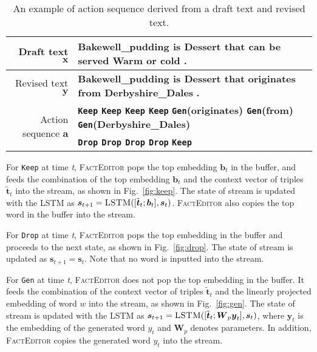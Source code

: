 \documentclass[11pt,a4paper]{article}
\newcommand{\orange}[1]{{\color[HTML]{ff7f0e}\textbf{#1}}}
\newcommand{\blue}[1]{{\color[HTML]{1f77b4}\textbf{#1}}}
\newcommand{\green}[1]{{\color[HTML]{2ca02c}\textbf{#1}}}
\begin{document}
\begin{table*}[t]
    \centering
    \small
    \begin{tabular}{r|l}
        \toprule
        Draft text $\boldsymbol{x}$ & \green{Bakewell\_pudding} \green{is} \green{Dessert} \green{that} \orange{can be served Warm or cold} \green{.} \\\midrule
        Revised text $\boldsymbol{y}$ & \green{Bakewell\_pudding is Dessert that} \blue{originates from Derbyshire\_Dales} \green{.}\\\midrule
        \multirow{2}{*}{Action sequence $\boldsymbol{a}$} & \green{\texttt{Keep} \texttt{Keep} \texttt{Keep} \texttt{Keep}} \blue{\texttt{Gen}(originates) \texttt{Gen}(from) \texttt{Gen}(Derbyshire\_Dales)}\\
        & \orange{\texttt{Drop} \texttt{Drop} \texttt{Drop} \texttt{Drop}} \green{\texttt{Keep}}\\
        \bottomrule
    \end{tabular}
    \caption{An example of action sequence derived from a draft text and revised text.}
    \label{tab:action}
\end{table*}
For \texttt{Keep} at time \textit{t}, \textsc{FactEditor} pops the top embedding $\boldsymbol{b}_t$ in the buffer, and feeds the combination of the top embedding $\boldsymbol{b}_t$ and the context vector of triples $\tilde{\boldsymbol{t}}_t$ into the stream, as shown in Fig.~\ref{fig:keep}. The state of stream is updated with the \textsc{LSTM} as 
$\boldsymbol{s}_{t+1} = \textsc{LSTM}([\tilde{\boldsymbol{t}}_t;\boldsymbol{b}_t], \boldsymbol{s}_{t})$.  \textsc{FactEditor} also copies the top word in the buffer into the stream.

For \texttt{Drop} at time \textit{t}, \textsc{FactEditor} pops the top embedding in the buffer and proceeds to the next state, as shown in Fig.~\ref{fig:drop}. The state of stream is updated as $\boldsymbol{s}_{t+1} = \boldsymbol{s}_{t}$. Note that no word is inputted into the stream.

For \texttt{Gen} at time \textit{t}, \textsc{FactEditor} does not pop the top embedding in the buffer. It feeds the combination of the context vector of triples $\tilde{\boldsymbol{t}}_t$ and the linearly projected embedding of word $w$ into the stream, as shown in Fig.~\ref{fig:gen}. The state of stream is updated with the LSTM as
$\boldsymbol{s}_{t+1} = \textsc{LSTM}([\tilde{\boldsymbol{t}}_t;\boldsymbol{W}_p \boldsymbol{y}_t], \boldsymbol{s}_{t})$, 
where $\boldsymbol{y}_t$ is the embedding of the generated word $y_t$ and $\boldsymbol{W}_p$ denotes parameters. In addition, \textsc{FactEditor} copies the generated word $y_t$ into the stream.
\end{document}
